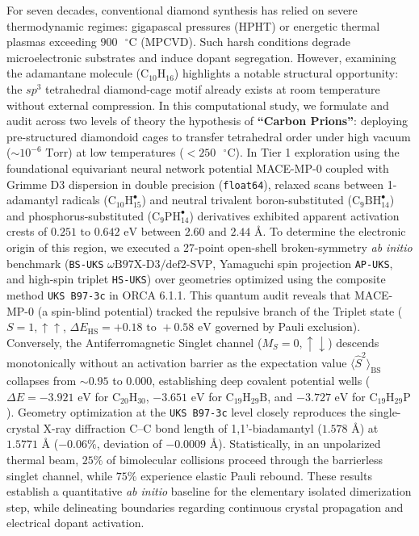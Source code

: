 \documentclass[10pt,twocolumn,a4paper]{article}
\begin{document}
\begin{@twocolumnfalse}
    \small
    For seven decades, conventional diamond synthesis has relied on severe thermodynamic regimes: gigapascal pressures (HPHT) or energetic thermal plasmas exceeding $900\text{ }^\circ\text{C}$ (MPCVD). Such harsh conditions degrade microelectronic substrates and induce dopant segregation. However, examining the adamantane molecule ($\text{C}_{10}\text{H}_{16}$) highlights a notable structural opportunity: the $sp^3$ tetrahedral diamond-cage motif already exists at room temperature without external compression. In this computational study, we formulate and audit across two levels of theory the hypothesis of \textbf{``Carbon Prions''}: deploying pre-structured diamondoid cages to transfer tetrahedral order under high vacuum ($\sim 10^{-6}\text{ Torr}$) at low temperatures ($< 250\text{ }^\circ\text{C}$). In Tier 1 exploration using the foundational equivariant neural network potential MACE-MP-0 coupled with Grimme D3 dispersion in double precision (\texttt{float64}), relaxed scans between 1-adamantyl radicals ($\text{C}_{10}\text{H}_{15}^\bullet$) and neutral trivalent boron-substituted ($\text{C}_9\text{BH}_{14}^\bullet$) and phosphorus-substituted ($\text{C}_9\text{PH}_{14}^\bullet$) derivatives exhibited apparent activation crests of $0.251\text{ to }0.642\text{ eV}$ between $2.60\text{ and }2.44\text{ \AA}$. To determine the electronic origin of this region, we executed a 27-point open-shell broken-symmetry \textit{ab initio} benchmark (\texttt{BS-UKS} $\omega\text{B97X-D3/def2-SVP}$, Yamaguchi spin projection \texttt{AP-UKS}, and high-spin triplet \texttt{HS-UKS}) over geometries optimized using the composite method \texttt{UKS B97-3c} in ORCA 6.1.1. This quantum audit reveals that MACE-MP-0 (a spin-blind potential) tracked the repulsive branch of the Triplet state ($S=1, \uparrow\uparrow$, $\Delta E_{\text{HS}} = +0.18\text{ to }+0.58\text{ eV}$ governed by Pauli exclusion). Conversely, the Antiferromagnetic Singlet channel ($M_S=0, \uparrow\downarrow$) descends monotonically without an activation barrier as the expectation value $\langle \hat{S}^2 \rangle_{\text{BS}}$ collapses from $\sim 0.95$ to $0.000$, establishing deep covalent potential wells ($\Delta E = -3.921\text{ eV}$ for $\text{C}_{20}\text{H}_{30}$, $-3.651\text{ eV}$ for $\text{C}_{19}\text{H}_{29}\text{B}$, and $-3.727\text{ eV}$ for $\text{C}_{19}\text{H}_{29}\text{P}$). Geometry optimization at the \texttt{UKS B97-3c} level closely reproduces the single-crystal X-ray diffraction C--C bond length of 1,1'-biadamantyl ($1.578\text{ \AA}$) at $1.5771\text{ \AA}$ ($-0.06\%$, deviation of $-0.0009\text{ \AA}$). Statistically, in an unpolarized thermal beam, $25\%$ of bimolecular collisions proceed through the barrierless singlet channel, while $75\%$ experience elastic Pauli rebound. These results establish a quantitative \textit{ab initio} baseline for the elementary isolated dimerization step, while delineating boundaries regarding continuous crystal propagation and electrical dopant activation.


\end{@twocolumnfalse}
\end{document}
